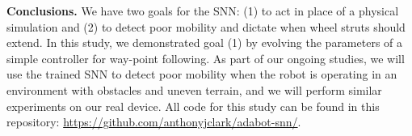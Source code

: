\noindent
\textbf{Conclusions.} We have two goals for the SNN: (1) to act in place of a physical simulation and (2) to detect poor mobility and dictate when wheel struts should extend.
%
In this study, we demonstrated goal (1) by evolving the parameters of a simple controller for way-point following.
%
As part of our ongoing studies, we will use the trained SNN to detect poor mobility when the robot is operating in an environment with obstacles and uneven terrain, and we will perform similar experiments on our real device. All code for this study can be found in this repository: \url{https://github.com/anthonyjclark/adabot-snn/}.
